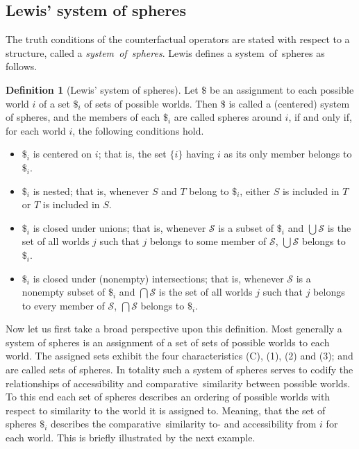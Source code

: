 \documentclass[a4paper,american,10pt]{paper}
\theoremstyle{definition}\newtheorem{definition}{Definition}
\begin{document}
\subsection{Lewis' system of spheres}
The truth conditions of the counterfactual operators are stated with respect to a structure, called a \textit{system~of~spheres}. Lewis defines a system~of~spheres as follows.
\begin{definition}[Lewis' system of spheres]
Let $\$$ be an assignment to each possible world $i$ of a set $\$_i$ of sets of possible worlds. Then $\$$ is called a (centered) system of spheres, and the members of each $\$_i$ are called spheres around $i$, if and only if, for each world $i$, the following conditions hold.
	\begin{itemize}
	\item[(C)] $\$_i$ is centered on $i$; that is, the set $\{i\}$ having $i$ as its only member belongs to $\$_i$.
	\item[(1)] $\$_i$ is nested; that is, whenever $S$ and $T$ belong to $\$_i$, either $S$ is included in $T$ or $T$ is included in $S$.
	\item[(2)] $\$_i$ is closed under unions; that is, whenever $\mathscr{S}$ is a subset of $\$_i$ and $\bigcup\mathscr{S}$ is the set of all worlds $j$ such that $j$ belongs to some member of $\mathscr{S}$, $\bigcup\mathscr{S}$ belongs to $\$_i$.
	\item[(3)] $\$_i$ is closed under (nonempty) intersections; that is, whenever $\mathscr{S}$ is a nonempty subset of $\$_i$ and $\bigcap\mathscr{S}$ is the set of all worlds $j$ such that $j$ belongs to every member of $\mathscr{S}$, $\bigcap\mathscr{S}$ belongs to $\$_i$.
	\end{itemize}
	\label{def:system_of_spheres}
\end{definition}
\noindent Now let us first take a broad perspective upon this definition. Most generally a system of spheres is an assignment of a set of sets of possible worlds to each world. The assigned sets exhibit the four characteristics (C), (1), (2) and (3); and are called sets of spheres. In totality such a system of spheres serves to codify the relationships of accessibility and comparative~similarity between possible worlds. To this end each set of spheres describes an ordering of possible worlds with respect to similarity to the world it is assigned to. Meaning, that the set of spheres $\$_i$ describes the comparative~similarity to- and accessibility from $i$ for each world. This is briefly illustrated by the next example.
\end{document}

